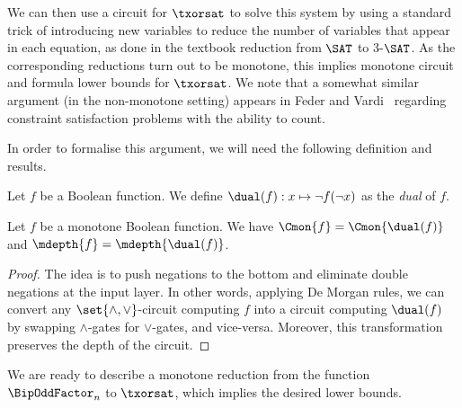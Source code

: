\documentclass[11pt]{article}
\begin{document}
We can then use a circuit for $\txorsat$ to solve this system
by using a standard trick of introducing new variables
to reduce the number of variables that appear in each equation,
as done in the textbook reduction from $\SAT$ to 3-$\SAT$. As the corresponding reductions turn out to be monotone, this implies monotone circuit and formula lower bounds for $\txorsat$.
We note that a somewhat similar   argument (in the non-monotone setting) appears in Feder and
Vardi~\cite[Theorem 30]{DBLP:journals/siamcomp/FederV98} regarding
constraint satisfaction problems with the ability to count.

In order to formalise this argument, we will need the following definition and results.

\begin{definition}
    \label{def:dual}
    Let $f$ be a Boolean function.
    We define $\dual(f) : x \mapsto \neg f(\neg x)$
    as the \emph{dual} of $f$.
\end{definition}

\begin{lemma}
    \label{lem:dual}
    Let $f$ be a monotone Boolean function.
    We have
    $\Cmon{f} = \Cmon{\dual(f)}$
    and
    $\mdepth{f} = \mdepth{\dual(f)}$.
\end{lemma}
\begin{proof}
    The idea is to push negations to the bottom and eliminate double negations at the input layer. In other words, applying De Morgan rules, we can convert any $\set{\land,\lor}$-circuit computing
    $f$ into a circuit computing $\dual(f)$ 
    by swapping $\land$-gates for
    $\lor$-gates, and vice-versa.
    Moreover, this transformation preserves the depth of the circuit.
\end{proof}




We are ready to describe a monotone reduction from the function $\BipOddFactor_n$ 
to $\txorsat$, which implies the desired lower bounds.
\end{document}

